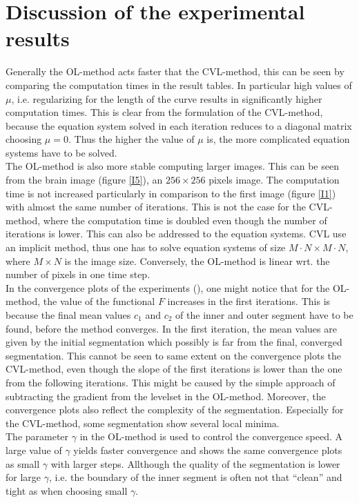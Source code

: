 \section{Discussion of the experimental results}
Generally the OL-method acts faster that the CVL-method, this can be seen by comparing the computation times in the result tables. In particular high values of $\mu$, i.e. regularizing for the length of the curve results in significantly higher computation times. This is clear from the formulation of the CVL-method, because the equation system solved in each iteration reduces to a diagonal matrix choosing $\mu=0$. Thus the higher the value of $\mu$ is, the more complicated equation systems have to be solved.\\
The OL-method is also more stable computing larger images. This can be seen from the brain image (figure \ref{I5}), an $256\times 256$ pixels image. The computation time is not increased particularly in comparison to the first image (figure \ref{I1}) with almost the same number of iterations. This is not the case for the CVL-method, where the computation time is doubled even though the number of iterations is lower. This can also be addressed to the equation systems. CVL use an implicit method, thus one has to solve equation systems of size $M\cdot N\times M\cdot N$, where $M\times N$ is the image size. Conversely, the OL-method is linear wrt. the number of pixels in one time step.\\
In the convergence plots of the experiments (), one might notice that for the OL-method, the value of the functional $F$ increases in the first iterations. This is because the final mean values $c_1$ and $c_2$ of the inner and outer segment have to be found, before the method converges. In the first iteration, the mean values are given by the initial segmentation which possibly is far from the final, converged segmentation. This cannot be seen to same extent on the convergence plots the CVL-method, even though the slope of the first iterations is lower than the one from the following iterations. This might be caused by the simple approach of subtracting the gradient from the levelset in the OL-method. Moreover, the convergence plots also reflect the complexity of the segmentation. Especially for the CVL-method, some segmentation show several local minima.\\
The parameter $\gamma$ in the OL-method is used to control the convergence speed. A large value of $\gamma$ yields faster convergence and shows the same convergence plots as small $\gamma$ with larger steps. Allthough the quality of the segmentation is lower for large $\gamma$, i.e. the boundary of the inner segment is often not that ``clean'' and tight as when choosing small $\gamma$.\\ 
